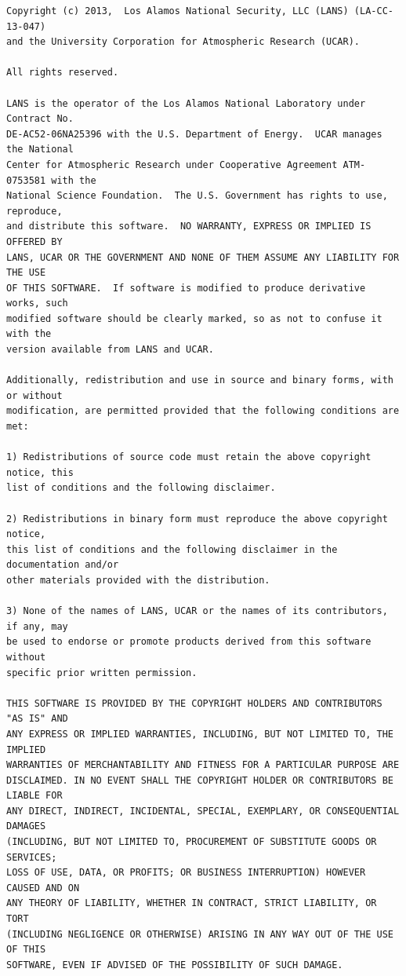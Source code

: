 \documentclass[11pt]{report}
\begin{document}
\begin{verbatim}
Copyright (c) 2013,  Los Alamos National Security, LLC (LANS) (LA-CC-13-047)
and the University Corporation for Atmospheric Research (UCAR).

All rights reserved.

LANS is the operator of the Los Alamos National Laboratory under Contract No.
DE-AC52-06NA25396 with the U.S. Department of Energy.  UCAR manages the National
Center for Atmospheric Research under Cooperative Agreement ATM-0753581 with the
National Science Foundation.  The U.S. Government has rights to use, reproduce,
and distribute this software.  NO WARRANTY, EXPRESS OR IMPLIED IS OFFERED BY
LANS, UCAR OR THE GOVERNMENT AND NONE OF THEM ASSUME ANY LIABILITY FOR THE USE
OF THIS SOFTWARE.  If software is modified to produce derivative works, such
modified software should be clearly marked, so as not to confuse it with the
version available from LANS and UCAR.

Additionally, redistribution and use in source and binary forms, with or without
modification, are permitted provided that the following conditions are met:

1) Redistributions of source code must retain the above copyright notice, this
list of conditions and the following disclaimer.

2) Redistributions in binary form must reproduce the above copyright notice,
this list of conditions and the following disclaimer in the documentation and/or
other materials provided with the distribution.

3) None of the names of LANS, UCAR or the names of its contributors, if any, may
be used to endorse or promote products derived from this software without
specific prior written permission.

THIS SOFTWARE IS PROVIDED BY THE COPYRIGHT HOLDERS AND CONTRIBUTORS "AS IS" AND
ANY EXPRESS OR IMPLIED WARRANTIES, INCLUDING, BUT NOT LIMITED TO, THE IMPLIED
WARRANTIES OF MERCHANTABILITY AND FITNESS FOR A PARTICULAR PURPOSE ARE
DISCLAIMED. IN NO EVENT SHALL THE COPYRIGHT HOLDER OR CONTRIBUTORS BE LIABLE FOR
ANY DIRECT, INDIRECT, INCIDENTAL, SPECIAL, EXEMPLARY, OR CONSEQUENTIAL DAMAGES
(INCLUDING, BUT NOT LIMITED TO, PROCUREMENT OF SUBSTITUTE GOODS OR SERVICES;
LOSS OF USE, DATA, OR PROFITS; OR BUSINESS INTERRUPTION) HOWEVER CAUSED AND ON
ANY THEORY OF LIABILITY, WHETHER IN CONTRACT, STRICT LIABILITY, OR TORT
(INCLUDING NEGLIGENCE OR OTHERWISE) ARISING IN ANY WAY OUT OF THE USE OF THIS
SOFTWARE, EVEN IF ADVISED OF THE POSSIBILITY OF SUCH DAMAGE.
\end{verbatim}
\end{document}
